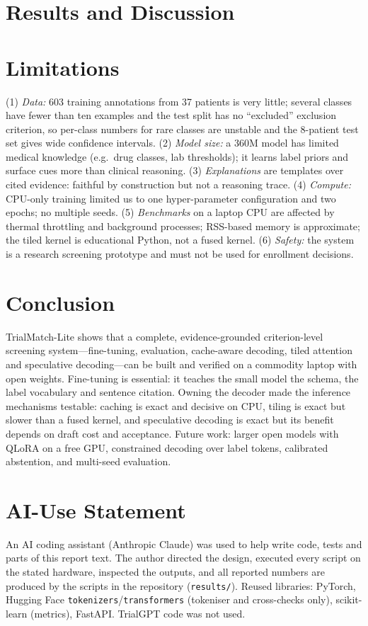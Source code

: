 \documentclass[conference]{IEEEtran}
\begin{document}
\section{Results and Discussion}


\section{Limitations}
(1) \emph{Data:} 603 training annotations from 37 patients is very little; several classes have fewer than ten examples and the test split has no ``excluded'' exclusion criterion, so per-class numbers for rare classes are unstable and the 8-patient test set gives wide confidence intervals. (2) \emph{Model size:} a 360M model has limited medical knowledge (e.g.\ drug classes, lab thresholds); it learns label priors and surface cues more than clinical reasoning. (3) \emph{Explanations} are templates over cited evidence: faithful by construction but not a reasoning trace. (4) \emph{Compute:} CPU-only training limited us to one hyper-parameter configuration and two epochs; no multiple seeds. (5) \emph{Benchmarks} on a laptop CPU are affected by thermal throttling and background processes; RSS-based memory is approximate; the tiled kernel is educational Python, not a fused kernel. (6) \emph{Safety:} the system is a research screening prototype and must not be used for enrollment decisions.

\section{Conclusion}
TrialMatch-Lite shows that a complete, evidence-grounded criterion-level screening system---fine-tuning, evaluation, cache-aware decoding, tiled attention and speculative decoding---can be built and verified on a commodity laptop with open weights. Fine-tuning is essential: it teaches the small model the schema, the label vocabulary and sentence citation. Owning the decoder made the inference mechanisms testable: caching is exact and decisive on CPU, tiling is exact but slower than a fused kernel, and speculative decoding is exact but its benefit depends on draft cost and acceptance. Future work: larger open models with QLoRA on a free GPU, constrained decoding over label tokens, calibrated abstention, and multi-seed evaluation.

\appendices
\section{AI-Use Statement}
An AI coding assistant (Anthropic Claude) was used to help write code, tests and parts of this report text. The author directed the design, executed every script on the stated hardware, inspected the outputs, and all reported numbers are produced by the scripts in the repository (\texttt{results/}). Reused libraries: PyTorch, Hugging Face \texttt{tokenizers}/\texttt{transformers} (tokeniser and cross-checks only), scikit-learn (metrics), FastAPI. TrialGPT code was not used.



\end{document}
